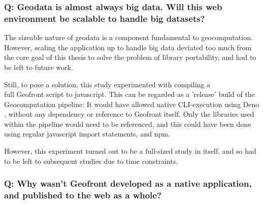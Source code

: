 \subsubsection*{Q: Geodata is almost always big data. Will this web environment be scalable to handle big datasets?}



The sizeable nature of geodata is a component fundamental to geocomputation.
However, scaling the application up to handle big data deviated too much from the core goal of this thesis to solve the problem of library portability, and had to be left to future work. 

Still, to pose a solution, this study experimented with compiling a \\ full Geofront script to javascript.
This can be regarded as a 'release' build of the Geocomputation pipeline: 
It would have allowed native CLI-execution using Deno \citep{contributers_deno_2022}, without any dependency or reference to Geofront itself.
Only the libraries used within the pipeline would need to be referenced, and this could have been done using regular javascript import statements, and npm.

However, this experiment turned out to be a full-sized study in itself, and so had to be left to subsequent studies due to time constraints. 

\subsubsection*{Q: Why wasn't Geofront developed as a native application, and published to the web as a whole?}

